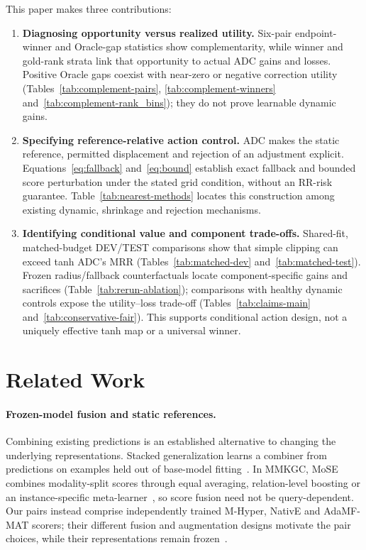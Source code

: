 \documentclass[11pt,a4paper]{article}
\begin{document}
This paper makes three contributions:
\begin{enumerate}
\item \textbf{Diagnosing opportunity versus realized utility.} Six-pair endpoint-winner and Oracle-gap statistics show complementarity, while winner and gold-rank strata link that opportunity to actual ADC gains and losses. Positive Oracle gaps coexist with near-zero or negative correction utility (Tables~\ref{tab:complement-pairs}, \ref{tab:complement-winners} and~\ref{tab:complement-rank_bins}); they do not prove learnable dynamic gains.
\item \textbf{Specifying reference-relative action control.} ADC makes the static reference, permitted displacement and rejection of an adjustment explicit. Equations~\eqref{eq:fallback} and~\eqref{eq:bound} establish exact fallback and bounded score perturbation under the stated grid condition, without an RR-risk guarantee. Table~\ref{tab:nearest-methods} locates this construction among existing dynamic, shrinkage and rejection mechanisms.
\item \textbf{Identifying conditional value and component trade-offs.} Shared-fit, matched-budget DEV/TEST comparisons show that simple clipping can exceed tanh ADC's MRR (Tables~\ref{tab:matched-dev} and~\ref{tab:matched-test}). Frozen radius/fallback counterfactuals locate component-specific gains and sacrifices (Table~\ref{tab:rerun-ablation}); comparisons with healthy dynamic controls expose the utility--loss trade-off (Tables~\ref{tab:claims-main} and~\ref{tab:conservative-fair}). This supports conditional action design, not a uniquely effective tanh map or a universal winner.
\end{enumerate}

\section{Related Work}

\paragraph{Frozen-model fusion and static references.}
Combining existing predictions is an established alternative to changing the underlying representations. Stacked generalization learns a combiner from predictions on examples held out of base-model fitting~\citep{wolpert1992}. In MMKGC, MoSE combines modality-split scores through equal averaging, relation-level boosting or an instance-specific meta-learner~\citep{mose}, so score fusion need not be query-dependent. Our pairs instead comprise independently trained M-Hyper, NativE and AdaMF-MAT scorers; their different fusion and augmentation designs motivate the pair choices, while their representations remain frozen~\citep{mhyper,native,adamf}.
\end{document}
